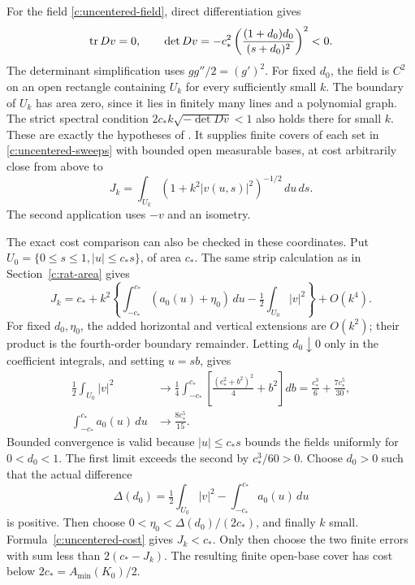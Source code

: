 For the field \eqref{c:uncentered-field}, direct differentiation gives
\begin{equation}\label{c:uncentered-spectrum}
 \operatorname{tr} Dv=0,\qquad
 \det Dv=-c_*^2\left(\frac{(1+d_0)d_0}{(s+d_0)^2}\right)^2<0.
\end{equation}
The determinant simplification uses $gg''/2=(g')^2$.
For fixed $d_0$, the field is $C^2$ on an open rectangle containing
$U_k$ for every sufficiently small $k$. The boundary of $U_k$ has
area zero, since it lies in finitely many lines and a polynomial graph.
The strict spectral condition
$2c_* k\sqrt{-\det Dv}<1$ also holds there for small $k$.
These are exactly the hypotheses of \BLogarithmic{}.
It supplies finite covers of each set in \eqref{c:uncentered-sweeps}
with bounded open measurable bases, at cost arbitrarily close from above to
\begin{equation}\label{c:logarithmic-cost}
 J_k=\int_{U_k}(1+k^2|v(u,s)|^2)^{-1/2}\,du\,ds.
\end{equation}
The second application uses $-v$ and an isometry.

The exact cost comparison can also be checked in these coordinates.
Put $U_0=\{0\le s\le1, |u|\le c_*s\}$, of area $c_*$.
The same strip calculation as in Section~\ref{c:rat-area} gives
\begin{equation}\label{c:uncentered-cost}
 J_k=c_*+k^2\left\{
 \int_{-c_*}^{c_*}(a_0(u)+\eta_0)\,du
 -\tfrac12\int_{U_0}|v|^2\right\}+O(k^4).
\end{equation}
For fixed $d_0,\eta_0$, the added horizontal and vertical extensions
are $O(k^2)$; their product is the fourth-order boundary remainder.
Letting $d_0\downarrow0$ only in the coefficient integrals, and setting
$u=sb$, gives
\begin{align*}
 \tfrac12\int_{U_0}|v|^2&\longrightarrow
 \frac14\int_{-c_*}^{c_*}
       \left[\frac{(c_*^2+b^2)^2}{4}+b^2\right]db
       =\frac{c_*^3}{6}+\frac{7c_*^5}{30},\\
 \int_{-c_*}^{c_*}a_0(u)\,du&\longrightarrow\frac{8c_*^5}{15}.
\end{align*}
Bounded convergence is valid because $|u|\le c_*s$ bounds the fields
uniformly for $0<d_0<1$. The first limit exceeds the second by
$c_*^3/60>0$. Choose $d_0>0$ such that the actual difference
\[
 \Delta(d_0)=\tfrac12\int_{U_0}|v|^2
                  -\int_{-c_*}^{c_*}a_0(u)\,du
\]
is positive. Then choose $0<\eta_0<\Delta(d_0)/(2c_*)$,
and finally $k$ small. Formula~\eqref{c:uncentered-cost}
gives $J_k<c_*$. Only then choose the two finite errors with sum
less than $2(c_*-J_k)$. The resulting finite open-base cover has
cost below $2c_*=A_{\min}(K_0)/2$.

